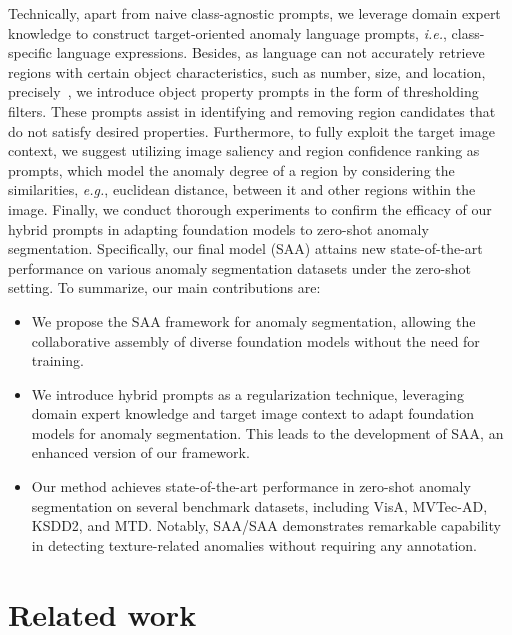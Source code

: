 \documentclass{article}
\begin{document}
Technically, apart from naive class-agnostic prompts, we leverage domain expert knowledge to construct target-oriented anomaly language prompts, \textit{i.e.}, class-specific language expressions. Besides, as language can not accurately retrieve regions with certain object characteristics, such as number, size, and location, precisely~\cite{paiss_count_2023,li2022r}, we introduce object property prompts in the form of thresholding filters. These prompts assist in identifying and removing region candidates that do not satisfy desired properties. Furthermore, to fully exploit the target image context, we suggest utilizing image saliency and region confidence ranking as prompts, which model the anomaly degree of a region by considering the similarities, \textit{e.g.}, euclidean distance, between it and other regions within the image. Finally, we conduct thorough experiments to confirm the efficacy of our hybrid prompts in adapting foundation models to zero-shot anomaly segmentation. Specifically, our final model (SAA) attains new state-of-the-art performance on various anomaly segmentation datasets under the zero-shot setting.
To summarize, our main contributions are:
\begin{itemize}
    \item We propose the SAA framework for anomaly segmentation, allowing the collaborative assembly of diverse foundation models without the need for training.
    \item We introduce hybrid prompts as a regularization technique, leveraging domain expert knowledge and target image context to adapt foundation models for anomaly segmentation. This leads to the development of SAA, an enhanced version of our framework.
    \item Our method achieves state-of-the-art performance in zero-shot anomaly segmentation on several benchmark datasets, including VisA, MVTec-AD, KSDD2, and MTD. Notably, SAA/SAA demonstrates remarkable capability in detecting texture-related anomalies without requiring any annotation.
\end{itemize}







\section{Related work}
\label{sec:related_work}
\end{document}
